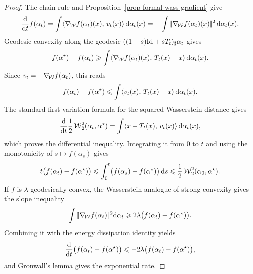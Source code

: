 \begin{proof}
	The chain rule and Proposition~\ref{prop-formal-wass-gradient} give
	\[
		\frac{\mathrm{d}}{\mathrm{d} t}f(\alpha_t)
		=
		\int \langle \nabla_{\!\operatorname{\mathcal{W}}} f(\alpha_t)(x),\,v_t(x)\rangle\,\mathrm{d}\alpha_t(x)
		=
		-\int |\!| \nabla_{\!\operatorname{\mathcal{W}}} f(\alpha_t)(x) |\!|^2\,\mathrm{d}\alpha_t(x).
	\]
	Geodesic convexity along the geodesic
	$((1-s)\mathrm{Id}+sT_t)_\sharp\alpha_t$ gives
	\[
		f(\alpha^\star)-f(\alpha_t)
		\geqslant
		\int \langle \nabla_{\!\operatorname{\mathcal{W}}} f(\alpha_t)(x),\,T_t(x)-x\rangle\,\mathrm{d}\alpha_t(x).
	\]
	Since $v_t=-\nabla_{\!\operatorname{\mathcal{W}}} f(\alpha_t)$, this reads
	\[
		f(\alpha_t)-f(\alpha^\star)
		\leqslant
		\int \langle v_t(x),\,T_t(x)-x\rangle\,\mathrm{d}\alpha_t(x).
	\]
	The standard first-variation formula for the squared Wasserstein distance gives
	\[
		\frac{\mathrm{d}}{\mathrm{d} t}\frac12\operatorname{\mathcal{W}}_2^2(\alpha_t,\alpha^\star)
		=
		\int \langle x-T_t(x),\,v_t(x)\rangle\,\mathrm{d}\alpha_t(x),
	\]
	which proves the differential inequality. Integrating it from $0$ to $t$ and using the monotonicity of $s\mapsto f(\alpha_s)$ gives
	\[
		t\bigl(f(\alpha_t)-f(\alpha^\star)\bigr)
		\leqslant
		\int_0^t \bigl(f(\alpha_s)-f(\alpha^\star)\bigr)\,\mathrm{d} s
		\leqslant
		\frac12\operatorname{\mathcal{W}}_2^2(\alpha_0,\alpha^\star).
	\]
	If $f$ is $\lambda$-geodesically convex, the Wasserstein analogue of strong convexity gives the slope inequality
	\[
		\int|\!| \nabla_{\!\operatorname{\mathcal{W}}} f(\alpha_t) |\!|^2\mathrm{d}\alpha_t
		\geqslant
		2\lambda\bigl(f(\alpha_t)-f(\alpha^\star)\bigr).
	\]
	Combining it with the energy dissipation identity yields
	\[
		\frac{\mathrm{d}}{\mathrm{d} t}\bigl(f(\alpha_t)-f(\alpha^\star)\bigr)
		\leqslant
		-2\lambda\bigl(f(\alpha_t)-f(\alpha^\star)\bigr),
	\]
	and Gronwall's lemma gives the exponential rate.
\end{proof}

